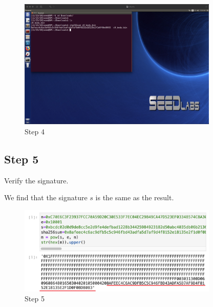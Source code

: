 \documentclass[onecolumn,oneside]{SUSTechHomework}
\begin{document}
  \begin{figure}[H]
    \centering
    \includegraphics[width=0.85\textwidth]{img/task6_8.png}
    \caption{Step 4}
  \end{figure}

  \subsection*{Step 5}

  Verify the signature.

  We find that the signature $s$ is the same as the result.

  \begin{figure}[H]
    \centering
    \includegraphics[width=0.85\textwidth]{img/task6_9.png}
    \caption{Step 5}
  \end{figure}
\end{document}
